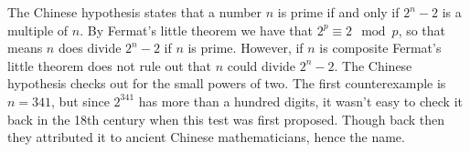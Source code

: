 \documentclass[12pt]{article}
\begin{document}
The Chinese hypothesis states that a number $n$ is prime if and only if $2^n -2$ is a multiple of $n$. By Fermat's little theorem we have that $2^p \equiv 2 \mod p$, so that means $n$ does divide $2^n- 2$ if $n$ is prime. However, if $n$ is composite Fermat's little theorem does not rule out that $n$ could divide $2^n-2$. The Chinese hypothesis checks out for the small powers of two. The first counterexample is $n=341$, but since $2^{341}$ has more than a hundred digits, it wasn't easy to check it back in the 18th century when this test was first proposed. Though back then they attributed it to ancient Chinese mathematicians, hence the name.
\end{document}
